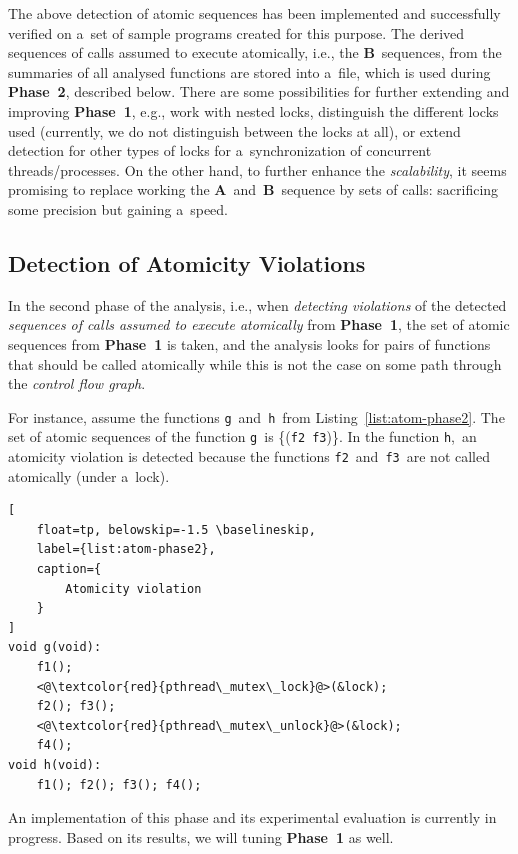 \documentclass{ExcelAtFIT}
\begin{document}
The above detection of atomic sequences
has been implemented and successfully verified
on a~set of sample programs created for
this purpose. The derived sequences of calls
assumed to execute atomically, i.e.,
the \textbf{B}~sequences, from the summaries
of all analysed functions are stored into a~file,
which is used during \textbf{Phase~2},
described below. There are some
possibilities for further extending and
improving \textbf{Phase~1}, e.g.,
work with nested locks, distinguish the
different locks used (currently, we do not
distinguish between the locks at all),
or extend detection for other types of
locks for a~synchronization of concurrent
threads/processes. On the other hand,
to further enhance the \emph{scalability},
it seems promising to replace working
the \textbf{A}~and~\textbf{B}~sequence
by sets of calls: sacrificing some precision
but gaining a~speed.

\subsection{Detection of Atomicity Violations}
\label{sec:atomicity-phase2}

In the second phase of the analysis, i.e.,
when \emph{detecting violations} of the detected
\emph{sequences of calls assumed to execute
atomically} from \textbf{Phase~1}, the set
of atomic sequences from \textbf{Phase~1}
is taken, and the analysis looks for pairs
of functions that should be called atomically
while this is not the case on some path
through the \emph{control flow graph}.

For instance, assume the functions
\texttt{g}~and~\texttt{h}~from
Listing~\ref{list:atom-phase2}.
The set of atomic sequences of the
function \texttt{g}~is 
\{(\texttt{f2}~\texttt{f3})\}. In the function 
\texttt{h},~an atomicity violation is detected 
because the functions 
\texttt{f2}~and~\texttt{f3}~are not called 
atomically (under a~lock).

\begin{lstlisting}[
    float=tp, belowskip=-1.5 \baselineskip,
    label={list:atom-phase2},
    caption={
        Atomicity violation
    }
]
void g(void):
    f1();
    <@\textcolor{red}{pthread\_mutex\_lock}@>(&lock);
    f2(); f3();
    <@\textcolor{red}{pthread\_mutex\_unlock}@>(&lock);
    f4();
void h(void):
    f1(); f2(); f3(); f4();
\end{lstlisting}

An implementation of this phase and its
experimental evaluation is currently in
progress. Based on its results, we will
tuning \textbf{Phase~1} as well.
\end{document}
